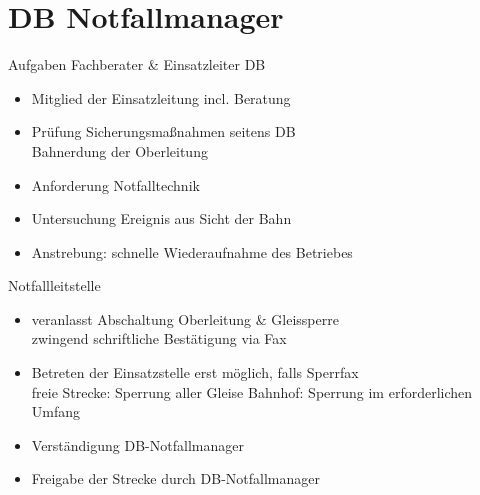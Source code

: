 \section{DB Notfallmanager}
\begin{sectionbox}{Aufgaben Fachberater \& Einsatzleiter DB}
    \begin{itemize}
        \item Mitglied der Einsatzleitung incl. Beratung
        \item Prüfung Sicherungsmaßnahmen seitens DB\\
        \ra Bahnerdung der Oberleitung
        \item Anforderung Notfalltechnik
        \item Untersuchung Ereignis aus Sicht der Bahn
        \item Anstrebung: schnelle Wiederaufnahme des Betriebes
    \end{itemize}
\end{sectionbox}
\begin{sectionbox}{Notfallleitstelle}
    \begin{itemize}
        \item veranlasst Abschaltung Oberleitung \& Gleissperre\\
        \ra zwingend schriftliche Bestätigung via Fax
        \item Betreten der Einsatzstelle erst möglich, falls Sperrfax\\
        \ra freie Strecke: Sperrung aller Gleise
        \ra Bahnhof: Sperrung im erforderlichen Umfang
        \item Verständigung DB-Notfallmanager
        \item Freigabe der Strecke durch DB-Notfallmanager
    \end{itemize}
\end{sectionbox}